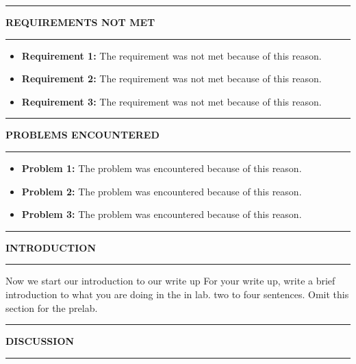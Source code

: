 \documentclass{article}
\begin{document}

\begin{center}
    \hrule
    \vspace{0.2cm}
    \textbf{\large REQUIREMENTS NOT MET}
    \vspace{0.2cm}
    \hrule
\end{center}
\begin{itemize}
    \item \textbf{Requirement 1:} The requirement was not met because of this reason.
    \item \textbf{Requirement 2:} The requirement was not met because of this reason.
    \item \textbf{Requirement 3:} The requirement was not met because of this reason.
\end{itemize}

\begin{center}
    \hrule
    \vspace{0.2cm}
    \textbf{\large PROBLEMS ENCOUNTERED}
    \vspace{0.2cm}
    \hrule
\end{center}
\begin{itemize}
    \item \textbf{Problem 1:} The problem was encountered because of this reason.
    \item \textbf{Problem 2:} The problem was encountered because of this reason.
    \item \textbf{Problem 3:} The problem was encountered because of this reason.
\end{itemize}

\begin{center}
    \hrule
    \vspace{0.2cm}
    \textbf{\large INTRODUCTION}
    \vspace{0.2cm}
    \hrule
\end{center}

Now we start our introduction to our write up
For your write up, write a brief introduction to what you are doing in the in lab. two to four sentences. 
Omit this section for the prelab.


\begin{center}
    \hrule
    \vspace{0.2cm}
    \textbf{\large DISCUSSION}
    \vspace{0.2cm}
    \hrule
\end{center}
\end{document}
